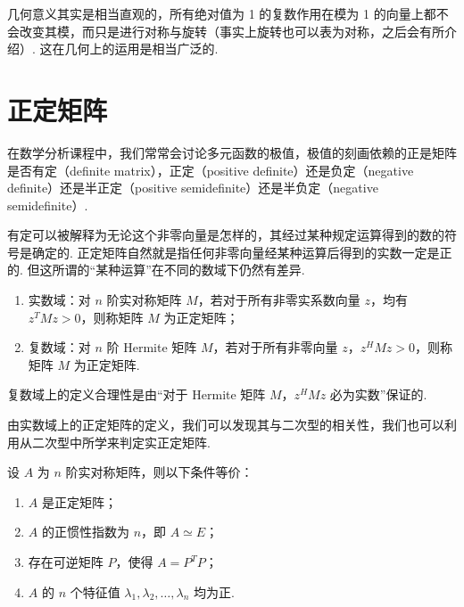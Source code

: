 几何意义其实是相当直观的，所有绝对值为 1 的复数作用在模为 1 的向量上都不会改变其模，而只是进行对称与旋转（事实上旋转也可以表为对称，之后会有所介绍）. 这在几何上的运用是相当广泛的.

\section{正定矩阵}

在数学分析课程中，我们常常会讨论多元函数的极值，极值的刻画依赖的正是矩阵是否有定（definite matrix），正定（positive definite）还是负定（negative definite）还是半正定（positive semidefinite）还是半负定（negative semidefinite）.

有定可以被解释为无论这个非零向量是怎样的，其经过某种规定运算得到的数的符号是确定的. 正定矩阵自然就是指任何非零向量经某种运算后得到的实数一定是正的. 但这所谓的``某种运算''在不同的数域下仍然有差异.

\begin{definition}[正定矩阵] 
    \begin{enumerate}
        \item 实数域：对 $ n $ 阶实对称矩阵 $ M $，若对于所有非零实系数向量 $ z $，均有$ z^{T}Mz > 0 $，则称矩阵 $ M $ 为正定矩阵；

        \item 复数域：对 $ n $ 阶 Hermite 矩阵 $ M $，若对于所有非零向量 $ z $，$ z^{H}Mz > 0 $，则称矩阵 $ M $ 为正定矩阵.
    \end{enumerate}
\end{definition}

复数域上的定义合理性是由``对于 Hermite 矩阵 $ M $，$ z^{H}Mz $ 必为实数''保证的.

由实数域上的正定矩阵的定义，我们可以发现其与二次型的相关性，我们也可以利用从二次型中所学来判定实正定矩阵.

\begin{theorem}
    设 $ A $ 为 $ n $ 阶实对称矩阵，则以下条件等价：
    \begin{enumerate}
        \item $ A $ 是正定矩阵；

        \item $ A $ 的正惯性指数为 $ n $，即 $ A \simeq E $；

        \item 存在可逆矩阵 $ P $，使得 $ A = P^{T}P $；

        \item $ A $ 的 $ n $ 个特征值 $ \lambda_1, \lambda_2, \ldots, \lambda_n $ 均为正.
    \end{enumerate}
\end{theorem}

